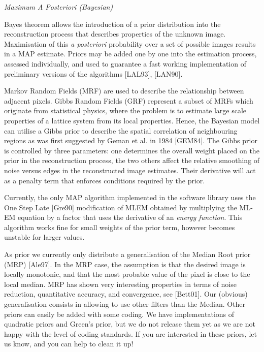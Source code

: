 \documentclass{article}
\begin{document}
\begin{spacing}{1.5}
\textit{Maximum A Posteriori (Bayesian)}


\end{spacing}

Bayes theorem allows the introduction of a prior distribution 
into the reconstruction process that describes properties of 
the unknown image. Maximisation of this \textit{a posteriori} probability 
over a set of possible images results in a MAP estimate. Priors 
may be added one by one into the estimation process, assessed 
individually, and used to guarantee a fast working implementation 
of preliminary versions of the algorithms [LAL93], [LAN90].

Markov Random Fields (MRF) are used to describe the relationship 
between adjacent pixels. Gibbs Random Fields (GRF) represent 
a subset of MRFs which originate from statistical physics, where 
the problem is to estimate large scale properties of a lattice 
system from its local properties. Hence, the Bayesian model can 
utilise a Gibbs prior to describe the spatial correlation of 
neighbouring regions as was first suggested by Geman et al. in 
1984 [GEM84]. The Gibbs prior is controlled by three parameters: 
one determines the overall weight placed on the prior in the 
reconstruction process, the two others affect the relative smoothing 
of noise versus edges in the reconstructed image estimates. Their 
derivative will act as a penalty term that enforces conditions 
required by the prior.

Currently, the only MAP algorithm implemented in the software 
library uses the One Step Late [Gre90] modification of MLEM obtained 
by multiplying the ML-EM equation by a factor that uses the derivative 
of an \textit{energy function}. This algorithm works fine 
for small weights of the prior term, however becomes unstable 
for larger values. 

As prior we currently only distribute a generalisation of the 
Median Root prior (MRP) [Ale97]. In the MRP case, the assumption 
is that the desired image is locally monotonic, and that the 
most probable value of the pixel is close to the local median. 
MRP has shown very interesting properties in terms of noise reduction, 
quantitative accuracy, and convergence, see [Bett01]. Our (obvious) 
generalisation consists in allowing to use other filters than 
the Median. Other priors can easily be added with some coding. 
We have implementations of quadratic priors and Green's prior, 
but we do not release them yet as we are not happy with the level 
of coding standards. If you are interested in these priors, let 
us know, and you can help to clean it up!
\end{document}
